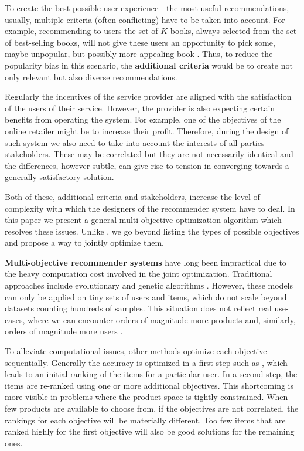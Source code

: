 \documentclass[letterpaper]{article}
\begin{document}
To create the best possible user experience - the most useful recommendations, usually, multiple criteria (often conflicting) have to be taken into account. For example, recommending to users the set of $K$ books, always selected from the set of best-selling books, will not give these users an opportunity to pick some, maybe unpopular, but possibly more appealing book \cite{abdollahpouri2017controlling}. Thus, to reduce the popularity bias in this scenario, the \textbf{additional criteria} would be to create not only relevant but also diverse recommendations.

Regularly the incentives of the service provider are aligned with the satisfaction of the users of their service. However, the provider is also expecting certain benefits from operating the system. For example, one of the objectives of the online retailer might be to increase their profit. Therefore, during the design of such system we also need to take into account the interests of all parties - stakeholders. These may be correlated but they are not necessarily identical and the differences, however subtle, can give rise to tension in converging towards a generally satisfactory solution.

Both of these, additional criteria and stakeholders, increase the level of complexity with which the designers of the recommender system have to deal. In this paper we present a general multi-objective optimization algorithm which resolves these issues. Unlike \cite{burke2018balanced}, we go beyond listing the types of possible objectives and propose a way to jointly optimize them.

\textbf{Multi-objective recommender systems} have long been impractical due to the heavy computation cost involved in the joint optimization. Traditional approaches include evolutionary and genetic algorithms \cite{lin2018multiobjective,lin2019evolutionary,geng2015nnia}. However, these models can only be applied on tiny sets of users and items, which do not scale beyond datasets counting hundreds of samples. This situation does not reflect real use-cases, where we can encounter orders of magnitude more products \cite{Gomez-Uribe:2015:NRS:2869770.2843948} and, similarly, orders of magnitude more users \cite{1167344}.

To alleviate computational issues, other methods optimize each objective sequentially. Generally the accuracy is optimized in a first step such as \cite{di2017adaptive,jugovac2017efficient}, which leads to an initial ranking of the items for a particular user. In a second step, the items are re-ranked using one or more additional objectives. This shortcoming is more visible in problems where the product space is tightly constrained. When few products are available to choose from, if the objectives are not correlated, the rankings for each objective will be materially different. Too few items that are ranked highly for the first objective will also be good solutions for the remaining ones.
\end{document}
